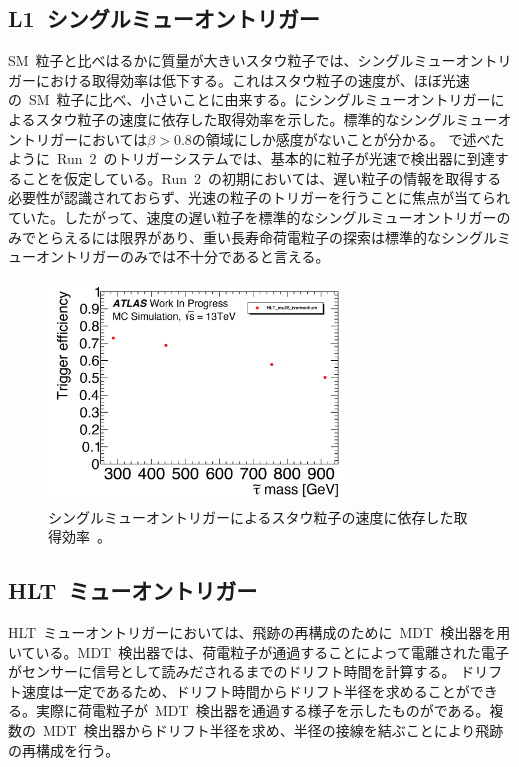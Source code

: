 \subsection{L1~シングルミューオントリガー}
SM~粒子と比べはるかに質量が大きいスタウ粒子では、シングルミューオントリガーにおける取得効率は低下する。これはスタウ粒子の速度が、ほぼ光速の~SM~粒子に比べ、小さいことに由来する。にシングルミューオントリガーによるスタウ粒子の速度に依存した取得効率を示した。標準的なシングルミューオントリガーにおいては$\beta>0.8$の領域にしか感度がないことが分かる。
で述べたように~Run~2~のトリガーシステムでは、基本的に粒子が光速で検出器に到達することを仮定している。Run~2~の初期においては、遅い粒子の情報を取得する必要性が認識されておらず、光速の粒子のトリガーを行うことに焦点が当てられていた。したがって、速度の遅い粒子を標準的なシングルミューオントリガーのみでとらえるには限界があり、重い長寿命荷電粒子の探索は標準的なシングルミューオントリガーのみでは不十分であると言える。
\begin{figure}[H]
        \centering   
        \includegraphics[width=0.7\textwidth,page=2]{img/pdf3/sumi.pdf}
        \caption[シングルミューオントリガーによるスタウ粒子の速度に依存した取得効率]{シングルミューオントリガーによるスタウ粒子の速度に依存した取得効率~\cite{MT:01}。}
        \label{fig:sumi2}
\end{figure}

\subsection{HLT~ミューオントリガー}
HLT~ミューオントリガーにおいては、飛跡の再構成のために~MDT~検出器を用いている。MDT~検出器では、荷電粒子が通過することによって電離された電子がセンサーに信号として読みだされるまでのドリフト時間を計算する。
ドリフト速度は一定であるため、ドリフト時間からドリフト半径を求めることができる。実際に荷電粒子が~MDT~検出器を通過する様子を示したものがである。複数の~MDT~検出器からドリフト半径を求め、半径の接線を結ぶことにより飛跡の再構成を行う。

